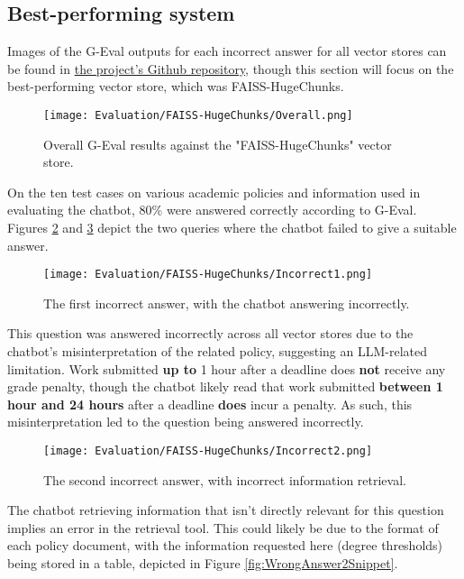 \subsection{Best-performing system}
\para Images of the G-Eval outputs for each incorrect answer for all vector stores can be found in \href{https://github.com/LewGoesB00M/CMP6200/tree/main/LaTeX/.images/Evaluation}{the project's Github repository}, though this section will focus on the best-performing vector store, which was 
FAISS-HugeChunks.

\begin{figure}[H]
    \centering
    \texttt{[image: Evaluation/FAISS-HugeChunks/Overall.png]}
    \caption{Overall G-Eval results against the "FAISS-HugeChunks" vector store. \label{fig:EvalResults}}
\end{figure}

\noindent On the ten test cases on various academic policies and information used in evaluating the chatbot,
80\% were answered correctly according to G-Eval. Figures \ref{fig:WrongAnswer1} and \ref{fig:WrongAnswer2} depict 
the two queries where the chatbot failed to give a suitable answer.

\begin{figure}[H]
    \centering
    \texttt{[image: Evaluation/FAISS-HugeChunks/Incorrect1.png]}
    \caption{The first incorrect answer, with the chatbot answering incorrectly. \label{fig:WrongAnswer1}}
\end{figure}

\noindent This question was answered incorrectly across all vector stores due to the chatbot's misinterpretation of the related policy, suggesting 
an LLM-related limitation. Work submitted \textbf{up to} 
1 hour after a deadline does \textbf{not} receive any grade penalty, though the chatbot likely read that work submitted \textbf{between 1 hour and 
24 hours} after a deadline \textbf{does} incur a penalty. As such, this misinterpretation led to the question being answered incorrectly.

\begin{figure}[H]
    \centering
    \texttt{[image: Evaluation/FAISS-HugeChunks/Incorrect2.png]}
    \caption{The second incorrect answer, with incorrect information retrieval. \label{fig:WrongAnswer2}}
\end{figure}

\noindent The chatbot retrieving information that isn't directly relevant for this question implies an error in the retrieval tool. 
This could likely be due to the format of each policy document, with the information requested here (degree thresholds) being stored in
a table, depicted in Figure \ref{fig:WrongAnswer2Snippet}.

